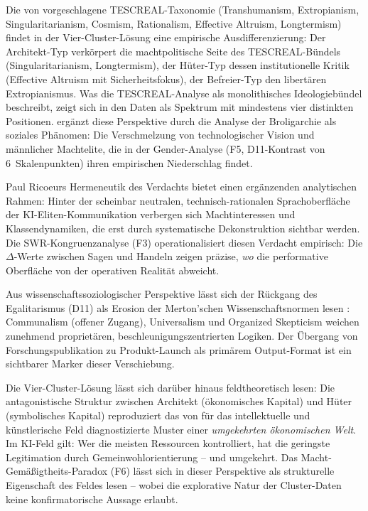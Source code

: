 \documentclass[12pt,a4paper]{article}
\begin{document}
Die von \citet{TorresGebru2024} vorgeschlagene TESCREAL-Taxonomie (Transhumanism, Extropianism, Singularitarianism, Cosmism, Rationalism, Effective Altruism, Longtermism) findet in der Vier-Cluster-L\"osung eine empirische Ausdifferenzierung: Der Architekt-Typ verk\"orpert die machtpolitische Seite des TESCREAL-B\"undels (Singularitarianism, Longtermism), der H\"uter-Typ dessen institutionelle Kritik (Effective Altruism mit Sicherheitsfokus), der Befreier-Typ den libert\"aren Extropianismus. Was die TESCREAL-Analyse als monolithisches Ideologieb\"undel beschreibt, zeigt sich in den Daten als Spektrum mit mindestens vier distinkten Positionen. \citet{Becker2025} erg\"anzt diese Perspektive durch die Analyse der \glqq Broligarchie\grqq{} als soziales Ph\"anomen: Die Verschmelzung von technologischer Vision und m\"annlicher Machtelite, die in der Gender-Analyse (F5, D11-Kontrast von 6~Skalenpunkten) ihren empirischen Niederschlag findet.

Paul Ricoeurs \glqq Hermeneutik des Verdachts\grqq{} \citep{Ricoeur1970} bietet einen erg\"anzenden analytischen Rahmen: Hinter der scheinbar neutralen, technisch-rationalen Sprachoberfl\"ache der KI-Eliten-Kommunikation verbergen sich Machtinteressen und Klassendynamiken, die erst durch systematische Dekonstruktion sichtbar werden. Die SWR-Kongruenzanalyse (F3) operationalisiert diesen Verdacht empirisch: Die $\Delta$-Werte zwischen Sagen und Handeln zeigen pr\"azise, \emph{wo} die performative Oberfl\"ache von der operativen Realit\"at abweicht.

Aus wissenschaftssoziologischer Perspektive l\"asst sich der R\"uckgang des Egalitarismus (D11) als Erosion der Merton'schen Wissenschaftsnormen lesen \citep{Merton1973}: Communalism (offener Zugang), Universalism und Organized Skepticism weichen zunehmend propriet\"aren, beschleunigungszentrierten Logiken. Der \"Ubergang von Forschungspublikation zu Produkt-Launch als prim\"arem Output-Format ist ein sichtbarer Marker dieser Verschiebung.

Die Vier-Cluster-L\"osung l\"asst sich dar\"uber hinaus feldtheoretisch lesen: Die antagonistische Struktur zwischen Architekt (\"okonomisches Kapital) und H\"uter (symbolisches Kapital) reproduziert das von \citet{Bourdieu1992} f\"ur das intellektuelle und k\"unstlerische Feld diagnostizierte Muster einer \emph{umgekehrten \"okonomischen Welt}. Im KI-Feld gilt: Wer die meisten Ressourcen kontrolliert, hat die geringste Legitimation durch Gemeinwohlorientierung -- und umgekehrt. Das Macht-Gem\"a\ss{}igtheits-Paradox (F6) l\"asst sich in dieser Perspektive als strukturelle Eigenschaft des Feldes lesen -- wobei die explorative Natur der Cluster-Daten keine konfirmatorische Aussage erlaubt.
\end{document}

